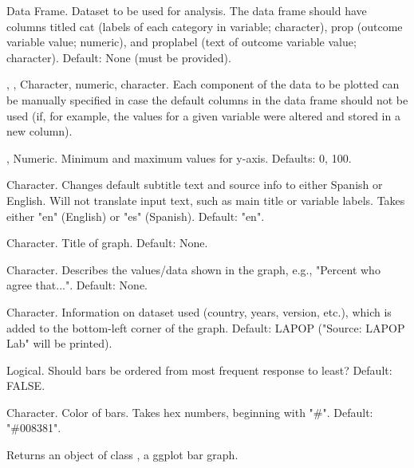 \documentclass[a4paper]{book}
\begin{document}
\begin{Arguments}
\begin{ldescription}
\item[\code{data}] Data Frame. Dataset to be used for analysis.  The data frame should have columns
titled cat (labels of each category in variable; character),
prop (outcome variable value; numeric), and proplabel (text of outcome variable value; character).
Default: None (must be provided).

\item[\code{cat\_var}, \code{outcome\_var}, \code{label\_var}] Character, numeric, character.
Each component of the data to be plotted can be manually specified in case
the default columns in the data frame should not be used (if, for example, the values for a given
variable were altered and stored in a new column).

\item[\code{ymin}, \code{ymax}] Numeric.  Minimum and maximum values for y-axis. Defaults: 0, 100.

\item[\code{lang}] Character.  Changes default subtitle text and source info to either Spanish or English.
Will not translate input text, such as main title or variable labels.  Takes either "en" (English)
or "es" (Spanish).  Default: "en".

\item[\code{main\_title}] Character.  Title of graph.  Default: None.

\item[\code{subtitle}] Character.  Describes the values/data shown in the graph, e.g., "Percent who agree that...".
Default: None.

\item[\code{source\_info}] Character.  Information on dataset used (country, years, version, etc.),
which is added to the bottom-left corner of the graph. Default: LAPOP ("Source: LAPOP Lab" will be printed).

\item[\code{order}] Logical.  Should bars be ordered from most frequent response to least?  Default: FALSE.

\item[\code{color\_scheme}] Character.  Color of bars.
Takes hex numbers, beginning with "\#". Default: "\#008381".
\end{ldescription}
\end{Arguments}
%
\begin{Value}
Returns an object of class , a ggplot bar graph.
\end{Value}
\end{document}
